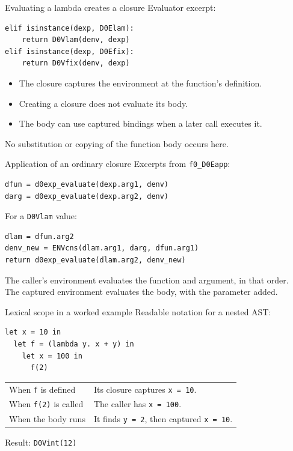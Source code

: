 \documentclass[aspectratio=169,11pt]{beamer}
\begin{document}
\begin{frame}[fragile]{Evaluating a lambda creates a closure}
Evaluator excerpt:
\begin{lstlisting}
elif isinstance(dexp, D0Elam):
    return D0Vlam(denv, dexp)
elif isinstance(dexp, D0Efix):
    return D0Vfix(denv, dexp)
\end{lstlisting}
\bigskip
\begin{itemize}
\item The closure captures the environment at the function's definition.
\item Creating a closure does not evaluate its body.
\item The body can use captured bindings when a later call executes it.
\end{itemize}
\medskip
No substitution or copying of the function body occurs here.
\end{frame}

\begin{frame}[fragile]{Application of an ordinary closure}
Excerpts from \texttt{f0\_D0Eapp}:
\begin{lstlisting}
dfun = d0exp_evaluate(dexp.arg1, denv)
darg = d0exp_evaluate(dexp.arg2, denv)
\end{lstlisting}
For a \texttt{D0Vlam} value:
\begin{lstlisting}
dlam = dfun.arg2
denv_new = ENVcns(dlam.arg1, darg, dfun.arg1)
return d0exp_evaluate(dlam.arg2, denv_new)
\end{lstlisting}
\medskip
The caller's environment evaluates the function and argument, in that order.\\[0.6em]
The \alert{captured environment} evaluates the body, with the parameter added.
\end{frame}

\begin{frame}[fragile]{Lexical scope in a worked example}
Readable notation for a nested AST:
\begin{lstlisting}[language={}]
let x = 10 in
  let f = (lambda y. x + y) in
    let x = 100 in
      f(2)
\end{lstlisting}
\bigskip
\begin{tabular}{ll}
When \texttt{f} is defined & Its closure captures \texttt{x = 10}.\\[0.7em]
When \texttt{f(2)} is called & The caller has \texttt{x = 100}.\\[0.7em]
When the body runs & It finds \texttt{y = 2}, then captured \texttt{x = 10}.\\
\end{tabular}
\par
\bigskip
\alert{Result: \texttt{D0Vint(12)}}
\end{frame}
\end{document}
